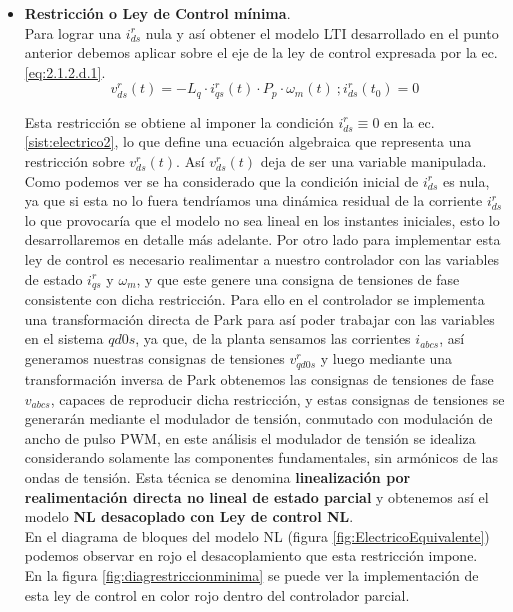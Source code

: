 \documentclass[10pt]{article}
\begin{document}
\begin{enumerate}
\begin{itemize}
	\item\textbf{ Restricción o Ley de Control mínima}.\\
	Para lograr una $i^{r}_{ds}$ nula y así obtener el modelo LTI desarrollado en el punto anterior debemos aplicar sobre el eje de la ley de control expresada por la ec. \ref{eq:2.1.2.d.1}.
	\begin{equation}
	v^{r}_{ds}(t)=-L_{q}\cdot i^{r}_{qs}(t)\cdot P_{p}\cdot \omega_{m}(t)\ ; i^{r}_{ds}(t_{0})=0
	\label{eq:2.1.2.d.1}
	\end{equation}
	
	Esta restricción se obtiene al imponer la condición $i^{r}_{ds}\equiv 0$ en la ec.\ref{sist:electrico2}, lo que define una ecuación algebraica que representa una restricción sobre $v^{r}_{ds}(t)$.
	Así $v^{r}_{ds}(t)$ deja de ser una variable manipulada. Como podemos ver se ha considerado que la condición inicial de $i^{r}_{ds}$ es nula, ya que si esta no lo fuera tendríamos una dinámica residual de la corriente $i^{r}_{ds}$ lo que provocaría que el modelo no sea lineal en los instantes iniciales, esto lo desarrollaremos en detalle más adelante.
	Por otro lado para implementar esta ley de control es necesario realimentar a nuestro controlador con las variables de estado $i^{r}_{qs}$ y $\omega_{m}$, y que este genere una consigna de tensiones de fase consistente con dicha restricción.
	Para ello en el controlador se implementa una transformación directa de Park para así poder trabajar con las variables en el sistema $qd0s$, ya que, de la planta sensamos las corrientes $i_{abcs}$, así generamos nuestras consignas de tensiones $v^{r}_{qd0s}$ y luego mediante una transformación inversa de Park obtenemos las consignas de tensiones de fase $v_{abcs}$, capaces de reproducir dicha restricción, y estas consignas de tensiones se generarán mediante el modulador de tensión, conmutado con modulación de ancho de pulso PWM, en este análisis el modulador de tensión se idealiza considerando solamente las componentes fundamentales, sin armónicos de las ondas de tensión.
	Esta técnica se denomina \textbf{linealización por realimentación directa no lineal de estado parcial} y obtenemos así el modelo \textbf{NL desacoplado con Ley de control NL}.\\
    En el diagrama de bloques del modelo NL (figura \ref{fig:ElectricoEquivalente}) podemos observar en rojo el desacoplamiento que esta restricción impone.\\
    En la figura \ref{fig:diagrestriccionminima} se puede ver la implementación de esta ley de control en color rojo dentro del controlador parcial.


\end{itemize}
\end{enumerate}
\end{document}
